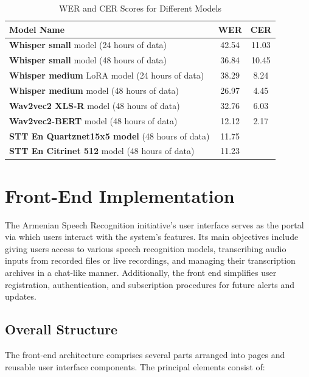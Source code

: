 \documentclass[conference]{IEEEtran}
\begin{document}
\begin{table}[ht]
    \centering
    \begin{tabular}{lcc}
        \toprule
        \textbf{Model Name} & \textbf{WER} &  \textbf{CER} \\
        \midrule
        \textbf{Whisper small} model (24 hours of data) & 42.54 & 11.03 \\
        \textbf{Whisper small} model (48 hours of data) & 36.84 & 10.45 \\
        \textbf{Whisper medium} LoRA model (24 hours of data) & 38.29&  8.24\\
        \textbf{Whisper medium} model (48 hours of data) & 26.97&  4.45\\
        \textbf{Wav2vec2 XLS-R} model (48 hours of data) & 32.76 & 6.03\\
        \textbf{Wav2vec2-BERT} model (48 hours of data) & 12.12 & 2.17\\
        \textbf{STT En Quartznet15x5 model} (48 hours of data) & 11.75 & \\
        \textbf{STT En Citrinet 512} model (48 hours of data) & 11.23 & \\
        
        \bottomrule
    \end{tabular}
    \caption{WER and CER Scores for Different Models}
    \label{tab:wer_cer_scores}
\end{table}


\section{Front-End Implementation}

The Armenian Speech Recognition initiative's user interface serves as the portal via which users interact with the system's features. Its main objectives include giving users access to various speech recognition models, transcribing audio inputs from recorded files or live recordings, and managing their transcription archives in a chat-like manner. Additionally, the front end simplifies user registration, authentication, and subscription procedures for future alerts and updates.

\subsection{Overall Structure}

The front-end architecture comprises several parts arranged into pages and reusable user interface components. The principal elements consist of:
\end{document}
